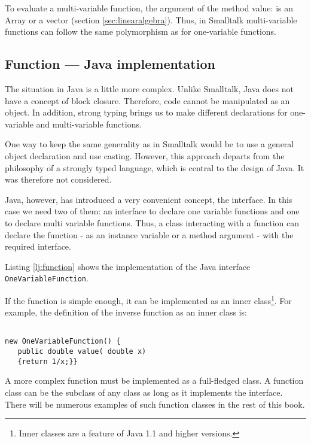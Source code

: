 \documentclass[twoside]{book}
\begin{document}
To evaluate a multi-variable function, the argument of the method
value: is an Array or a vector (\cf section
\ref{sec:linearalgebra}). Thus, in Smalltalk multi-variable
functions can follow the same polymorphism as for one-variable
functions.

\subsection{Function --- Java implementation}
\label{sec:jvFunction} The situation in Java is
a little more complex. Unlike Smalltalk, Java does not have a
concept of block closure. Therefore, code cannot be manipulated as
an object. In addition, strong typing brings us to make different
declarations for one-variable and multi-variable functions.

One way to keep the same generality as in Smalltalk would be to
use a general object declaration and use casting. However, this
approach departs from the philosophy of a strongly typed language,
which is central to the design of Java. It was therefore not
considered.

Java, however, has introduced a very convenient concept, the
interface. In this case we need two of them: an interface to
declare one variable functions and one to declare multi variable
functions. Thus, a class interacting with a function can declare
the function - as an instance variable or a method argument - with
the required interface.

Listing \ref{lj:function} shows the implementation of the Java
interface {\tt OneVariableFunction}.
\begin{listing}
\label{lj:function}

\end{listing}
If the function is simple enough, it can be implemented as an
inner class\footnote{Inner classes are a feature of Java 1.1 and
higher versions.}. For example, the definition of the inverse
function as an inner class is:
\begin{codeExample}
\begin{verbatim}

new OneVariableFunction() {
   public double value( double x)
   {return 1/x;}}
\end{verbatim}
\end{codeExample}
A more complex function must be implemented as a full-fledged
class. A function class can be the subclass of any class as long
as it implements the interface. There will be numerous examples of
such function classes in the rest of this book.
\end{document}

